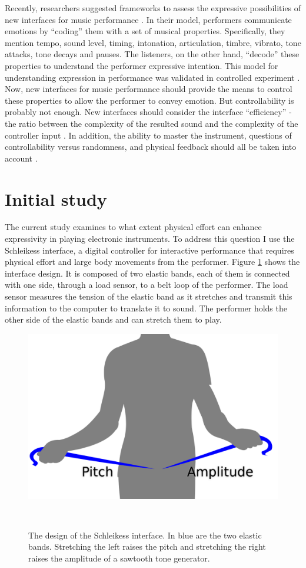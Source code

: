 \documentclass{sigchi}
\begin{document}
Recently, researchers suggested frameworks to assess the expressive possibilities of new interfaces for music performance \cite{Poepel2005}.
In their model, performers communicate emotions by ``coding'' them with a set of musical properties.
Specifically, they mention tempo, sound level, timing, intonation, articulation, timbre, vibrato, tone attacks, tone decays and pauses.
The listeners, on the other hand, ``decode'' these properties to understand the performer expressive intention.
This model for understanding expression in performance was validated in controlled experiment \cite{Gabrielsson1996}.
Now, new interfaces for music performance should provide the means to control these properties to allow the performer to convey emotion.
But controllability is probably not enough.
New interfaces should consider the interface ``efficiency'' - the ratio between the complexity of the resulted sound and the complexity of the controller input \cite{Jorda2004}.
In addition, the ability to master the instrument, questions of controllability versus randomness, and physical feedback should all be taken into account \cite{Dobrian2006}.

\section{Initial study}

The current study examines to what extent physical effort can enhance expressivity in playing electronic instruments.
To address this question I use the Schleikess interface, a digital controller for interactive performance that requires physical effort and large body movements from the performer.
Figure \ref{fig:schleikess} shows the interface design.
It is composed of two elastic bands, each of them is connected with one side, through a load sensor, to a belt loop of the performer.
The load sensor measures the tension of the elastic band as it stretches and transmit this information to the computer to translate it to sound.
The performer holds the other side of the elastic bands and can stretch them to play.

\begin{figure}
  \centering
  \includegraphics[width=0.9\columnwidth]{figures/schleikess}
  \caption{The design of the Schleikess interface. In blue are the two elastic bands. Stretching the left raises the pitch and stretching the right raises the amplitude of a sawtooth tone generator.}~\label{fig:schleikess}
\end{figure}
\end{document}
